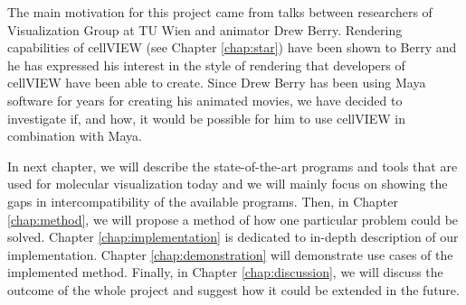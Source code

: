 \documentclass[
  digital, %
  table,   %
  nolof,     %
  nolot,     %
  oneside,
]{fithesis3}
\begin{document}


The main motivation for this project came from talks between researchers of Visualization Group at TU Wien and animator Drew Berry. Rendering capabilities of cellVIEW (see Chapter \ref{chap:star}) have been shown to Berry and he has expressed his interest in the style of rendering that developers of cellVIEW have been able to create. Since Drew Berry has been using Maya software for years for creating his animated movies, we have decided to investigate if, and how, it would be possible for him to use cellVIEW in combination with Maya.

In next chapter, we will describe the state-of-the-art programs and tools that are used for molecular visualization today and we will mainly focus on showing the gaps in intercompatibility of the available programs. Then, in Chapter \ref{chap:method}, we will propose a method of how one particular problem could be solved. Chapter \ref{chap:implementation} is dedicated to in-depth description of our implementation. Chapter \ref{chap:demonstration} will demonstrate use cases of the implemented method. Finally, in Chapter \ref{chap:discussion}, we will discuss the outcome of the whole project and suggest how it could be extended in the future.
\end{document}
